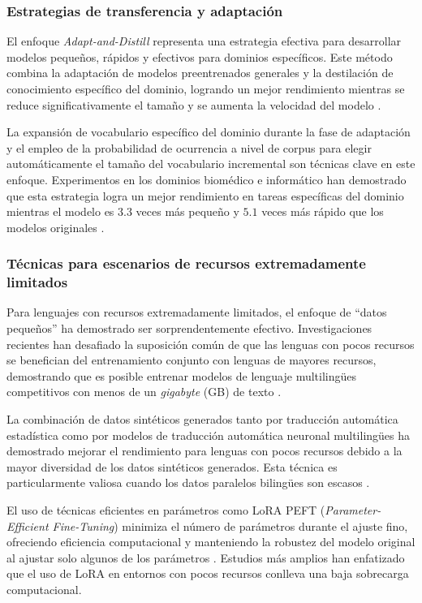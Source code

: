 \documentclass[10pt,twoside]{rcmart} %
\begin{document}
\subsubsection{Estrategias de transferencia y adaptación}

El enfoque \textit{Adapt-and-Distill} representa una estrategia efectiva para desarrollar modelos pequeños, rápidos y efectivos para dominios específicos. Este método combina la adaptación de modelos preentrenados generales y la destilación de conocimiento específico del dominio, logrando un mejor rendimiento mientras se reduce significativamente el tamaño y se aumenta la velocidad del modelo \cite{yao2021adapt}.

La expansión de vocabulario específico del dominio durante la fase de adaptación y el empleo de la probabilidad de ocurrencia a nivel de corpus para elegir automáticamente el tamaño del vocabulario incremental son técnicas clave en este enfoque. Experimentos en los dominios biomédico e informático han demostrado que esta estrategia logra un mejor rendimiento en tareas específicas del dominio mientras el modelo es $3.3$ veces más pequeño y $5.1$ veces más rápido que los modelos originales \cite{yao2021adapt}.

\subsubsection{Técnicas para escenarios de recursos extremadamente limitados}

Para lenguajes con recursos extremadamente limitados, el enfoque de ``datos pequeños'' ha demostrado ser sorprendentemente efectivo. Investigaciones recientes han desafiado la suposición común de que las lenguas con pocos recursos se benefician del entrenamiento conjunto con lenguas de mayores recursos, demostrando que es posible entrenar modelos de lenguaje multilingües competitivos con menos de un \textit{gigabyte} (GB) de texto \cite{ogueji2021small}.

La combinación de datos sintéticos generados tanto por traducción automática estadística como por modelos de traducción automática neuronal multilingües ha demostrado mejorar el rendimiento para lenguas con pocos recursos debido a la mayor diversidad de los datos sintéticos generados. Esta técnica es particularmente valiosa cuando los datos paralelos bilingües son escasos \cite{shu2024transcending}.

El uso de técnicas eficientes en parámetros como LoRA PEFT (\textit{Parameter-Efficient Fine-Tuning}) minimiza el número de parámetros durante el ajuste fino, ofreciendo eficiencia computacional y manteniendo la robustez del modelo original al ajustar solo algunos de los parámetros \cite{chavan2023one}. Estudios más amplios han enfatizado que el uso de LoRA en entornos con pocos recursos conlleva una baja sobrecarga computacional. %
\end{document}
